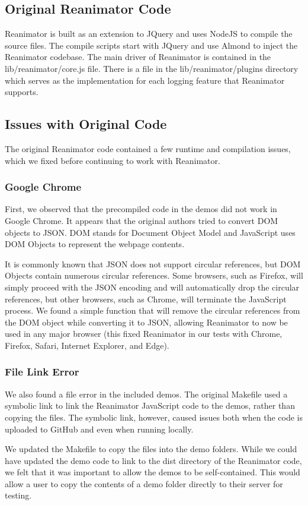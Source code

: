 \documentclass[12pt,journal]{IEEEtran}
\begin{document}
\subsection{Original Reanimator Code}
Reanimator is built as an extension to JQuery and uses NodeJS to compile the source files. The compile scripts start with JQuery and use Almond to inject the Reanimator codebase. The main driver of Reanimator is contained in the lib/reanimator/core.js file. There is a file in the lib/reanimator/plugins directory which serves as the implementation for each logging feature that Reanimator supports.

\subsection{Issues with Original Code}
The original Reanimator code contained a few runtime and compilation issues, which we fixed before continuing to work with Reanimator.

\subsubsection{Google Chrome}
First, we observed that the precompiled code in the demos did not work in Google Chrome. It appears that the original authors tried to convert DOM objects to JSON. DOM stands for Document Object Model and JavaScript uses DOM Objects to represent the webpage contents.
\par
It is commonly known that JSON does not support circular references, but DOM Objects contain numerous circular references. Some browsers, such as Firefox, will simply proceed with the JSON encoding and will automatically drop the circular references, but other browsers, such as Chrome, will terminate the JavaScript process. We found a simple function that will remove the circular references from the DOM object while converting it to JSON, allowing Reanimator to now be used in any major browser (this fixed Reanimator in our tests with Chrome, Firefox, Safari, Internet Explorer, and Edge).

\subsubsection{File Link Error}
We also found a file error in the included demos. The original Makefile used a symbolic link to link the Reanimator JavaScript code to the demos, rather than copying the files. The symbolic link, however, caused issues both when the code is uploaded to GitHub and even when running locally.
\par
We updated the Makefile to copy the files into the demo folders. While we could have updated the demo code to link to the dist directory of the Reanimator code, we felt that it was important to allow the demos to be self-contained. This would allow a user to copy the contents of a demo folder directly to their server for testing.
\end{document}
